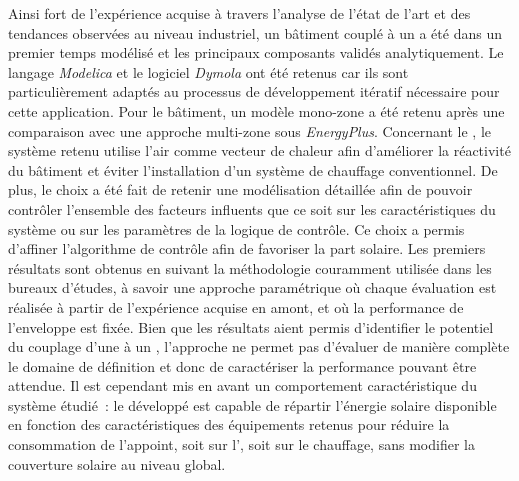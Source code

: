 Ainsi fort de l’expérience acquise à travers l’analyse de l’état de l’art et des tendances
observées au niveau industriel, un bâtiment couplé à un  a été dans un premier temps
modélisé et les principaux composants validés analytiquement. Le langage \textit{Modelica}
et le logiciel \textit{Dymola} ont été retenus car ils sont particulièrement adaptés au
processus de développement itératif nécessaire pour cette application. Pour le bâtiment,
un modèle mono-zone a été retenu après une comparaison avec une approche multi-zone
sous \textit{EnergyPlus}. Concernant le , le système retenu utilise l’air
comme vecteur de chaleur afin d’améliorer la réactivité du bâtiment et éviter
l’installation d’un système de chauffage conventionnel. De plus, le choix a été fait de
retenir une modélisation détaillée afin de pouvoir contrôler l’ensemble des facteurs
influents que ce soit sur les caractéristiques du système ou sur les paramètres de la
logique de contrôle. Ce choix a permis d’affiner l’algorithme de contrôle afin de
favoriser la part solaire. Les
premiers résultats sont obtenus en suivant la méthodologie couramment utilisée dans les
bureaux d’études, à savoir une approche paramétrique où chaque évaluation est réalisée
à partir de l’expérience acquise en amont, et où la performance de l’enveloppe est fixée. Bien que les
résultats aient permis d’identifier le potentiel du couplage d’une  à un
, l’approche ne permet pas d’évaluer de manière complète le domaine de
définition et donc de caractériser la performance pouvant être attendue.
Il est cependant mis en avant
un comportement caractéristique du système étudié~: le  développé est capable de
répartir l’énergie solaire disponible en fonction des caractéristiques des équipements
retenus pour réduire la consommation de l’appoint, soit sur l’, soit sur le chauffage,
sans modifier la couverture solaire au niveau global.

